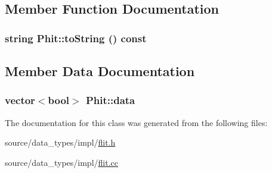 \subsection{Member Function Documentation}
\hypertarget{classPhit_71d43cdc2c23a7788b8724a4b12b261b}{
\subsubsection[{toString}]{\setlength{\rightskip}{0pt plus 5cm}string Phit::toString () const}}
\label{classPhit_71d43cdc2c23a7788b8724a4b12b261b}




\subsection{Member Data Documentation}
\hypertarget{classPhit_de0670c9ef9f280e53ce73980b785a8c}{
\subsubsection[{data}]{\setlength{\rightskip}{0pt plus 5cm}vector$<$bool$>$ {\bf Phit::data}}}
\label{classPhit_de0670c9ef9f280e53ce73980b785a8c}




The documentation for this class was generated from the following files:\begin{CompactItemize}
\item 
source/data\_\-types/impl/\hyperlink{flit_8h}{flit.h}\item 
source/data\_\-types/impl/\hyperlink{flit_8cc}{flit.cc}\end{CompactItemize}
